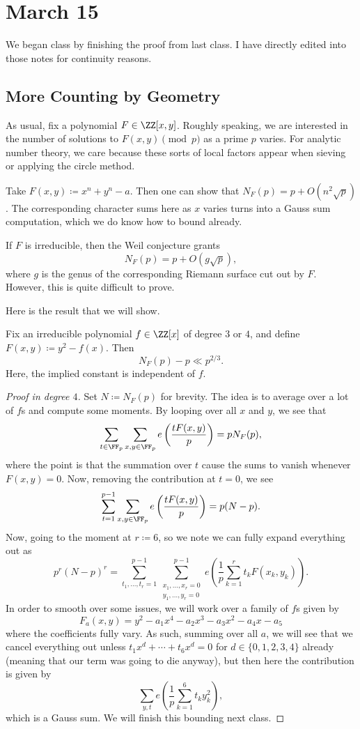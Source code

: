 \documentclass[../notes.tex]{subfiles}
\begin{document}
\section{March 15}

We began class by finishing the proof from last class. I have directly edited into those notes for continuity reasons.

\subsection{More Counting by Geometry}
As usual, fix a polynomial $F\in\ZZ[x,y]$. Roughly speaking, we are interested in the number of solutions to $F(x,y)\pmod p$ as a prime $p$ varies. For analytic number theory, we care because these sorts of local factors appear when sieving or applying the circle method.
\begin{example}
	Take $F(x,y)\coloneqq x^n+y^n-a$. Then one can show that $N_F(p)=p+O\left(n^2\sqrt p\right)$. The corresponding character sums here as $x$ varies turns into a Gauss sum computation, which we do know how to bound already.
\end{example}
\begin{remark}
	If $F$ is irreducible, then the Weil conjecture grants
	\[N_F(p)=p+O(g\sqrt p),\]
	where $g$ is the genus of the corresponding Riemann surface cut out by $F$. However, this is quite difficult to prove.
\end{remark}
Here is the result that we will show.
\begin{theorem}
	Fix an irreducible polynomial $f\in\ZZ[x]$ of degree $3$ or $4$, and define $F(x,y)\coloneqq y^2-f(x)$. Then
	\[N_F(p)-p\ll p^{2/3}.\]
	Here, the implied constant is independent of $f$.
\end{theorem}
\begin{proof}[Proof in degree $4$]
	Set $N\coloneqq N_F(p)$ for brevity. The idea is to average over a lot of $f$s and compute some moments. By looping over all $x$ and $y$, we see that
	\[\sum_{t\in\FF_p}\sum_{x,y\in\FF_p}e\left(\frac{tF(x,y)}p\right)=pN_F(p),\]
	where the point is that the summation over $t$ cause the sums to vanish whenever $F(x,y)=0$. Now, removing the contribution at $t=0$, we see
	\[\sum_{t=1}^{p-1}\sum_{x,y\in\FF_p}e\left(\frac{tF(x,y)}p\right)=p(N-p).\]
	Now, going to the moment at $r\coloneqq6$, so we note we can fully expand everything out as
	\[p^r(N-p)^r=\sum_{t_1,\ldots,t_r=1}^{p-1}\sum_{\substack{x_1,\ldots,x_r=0\\y_1,\ldots,y_r=0}}^{p-1}e\left(\frac1p\sum_{k=1}^rt_kF(x_k,y_k)\right).\]
	In order to smooth over some issues, we will work over a family of $f$s given by
	\[F_a(x,y)=y^2-a_1x^4-a_2x^3-a_3x^2-a_4x-a_5\]
	where the coefficients fully vary. As such, summing over all $a$, we will see that we cancel everything out unless $t_1x^d+\cdots+t_6x^d=0$ for $d\in\{0,1,2,3,4\}$ already (meaning that our term was going to die anyway), but then here the contribution is given by
	\[\sum_{y,t}e\left(\frac1p\sum_{k=1}^6t_ky_k^2\right),\]
	which is a Gauss sum. We will finish this bounding next class.
\end{proof}
\end{document}
